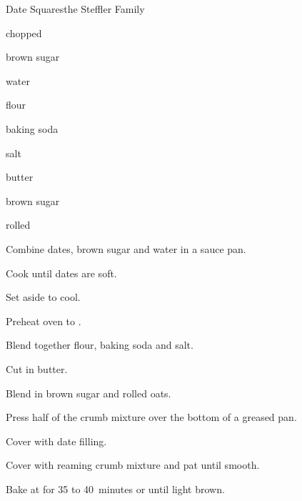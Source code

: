 \begin{recipe}{Date Squares}{the Steffler Family}{}

\begin{ingredients}
\item {} chopped 
\item {} brown sugar
\item {} water
\item {} flour
\item {} baking soda
\item \tp{\quarter} salt
\item {} butter
\item {} brown sugar
\item {} rolled 
\end{ingredients}

\begin{directions}
\item Combine dates, brown sugar and water in a sauce pan.
\item Cook until dates are soft.
\item Set aside to cool.
\item Preheat oven to .
\item Blend together flour, baking soda and salt.
\item Cut in butter.
\item Blend in brown sugar and rolled oats.
\item Press half of the crumb mixture over the bottom of a greased pan.
\item Cover with date filling.
\item Cover with reaming crumb mixture and pat until smooth.
\item Bake at for 35 to 40~minutes or until light brown.
\end{directions}
\end{recipe}
